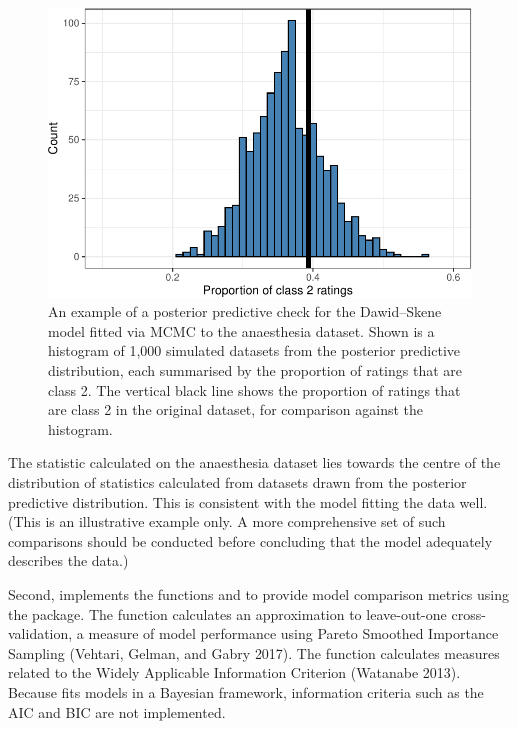 \begin{figure}

{\centering \includegraphics{RJ-2023-064_files/figure-latex/plot-ppcs-1} 

}

\caption{An example of a posterior predictive check for the Dawid--Skene model fitted via MCMC to the anaesthesia dataset.  Shown is a histogram of 1,000 simulated datasets from the posterior predictive distribution, each summarised by the proportion of ratings that are class 2.  The vertical black line shows the proportion of ratings that are class 2 in the original dataset, for comparison against the histogram.}\label{fig:plot-ppcs}
\end{figure}

The statistic calculated on the anaesthesia dataset lies towards the centre of
the distribution of statistics calculated from datasets drawn from the
posterior predictive distribution. This is consistent with the model fitting
the data well. (This is an illustrative example only. A more comprehensive
set of such comparisons should be conducted before concluding that the model
adequately describes the data.)

Second,  implements the functions  and 
to provide model comparison metrics using the  package. The
function  calculates an approximation to leave-out-one
cross-validation, a measure of model performance using Pareto Smoothed
Importance Sampling (Vehtari, Gelman, and Gabry 2017). The function  calculates
measures related to the Widely Applicable Information Criterion
(Watanabe 2013). Because  fits models in a Bayesian
framework, information criteria such as the AIC and BIC are not implemented.

